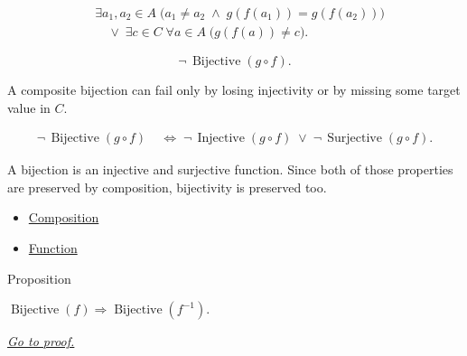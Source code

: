 \begin{remark*}
\[
\begin{aligned}
&\exists a_1,a_2\in A\;\bigl(a_1\neq a_2\;\wedge\;g(f(a_1))=g(f(a_2))\bigr) \\
&\quad\vee\;
  \exists c\in C\;\forall a\in A\;\bigl(g(f(a))\neq c\bigr).
\end{aligned}
\]
\end{remark*}

\begin{remark*}
\[
  \neg\,\operatorname{Bijective}(g\circ f).
\]
\end{remark*}

\begin{remark*}
A composite bijection can fail only by losing injectivity or by missing
some target value in $C$.
\end{remark*}

\begin{remark*}
\[
\begin{aligned}
\neg\,\operatorname{Bijective}(g\circ f)
&\;\Longleftrightarrow\;
\neg\,\operatorname{Injective}(g\circ f)
\;\vee\;
\neg\,\operatorname{Surjective}(g\circ f).
\end{aligned}
\]
\end{remark*}

\begin{remark*}[Interpretation]
A bijection is an injective and surjective function. Since both of those
properties are preserved by composition, bijectivity is preserved too.
\end{remark*}

\begin{dependencies}
\begin{itemize}
  \item \hyperref[def:composition]{Composition}
  \item \hyperref[def:function]{Function}
\end{itemize}
\end{dependencies}

\begin{propositionbox}{Proposition}
\begin{proposition}
\label{prop:inverse-bijection}
$\operatorname{Bijective}(f)\Rightarrow\operatorname{Bijective}(f^{-1})$.

\smallskip\noindent
\hyperref[prf:inverse-bijection]{\textit{Go to proof.}}
\end{proposition}
\end{propositionbox}

